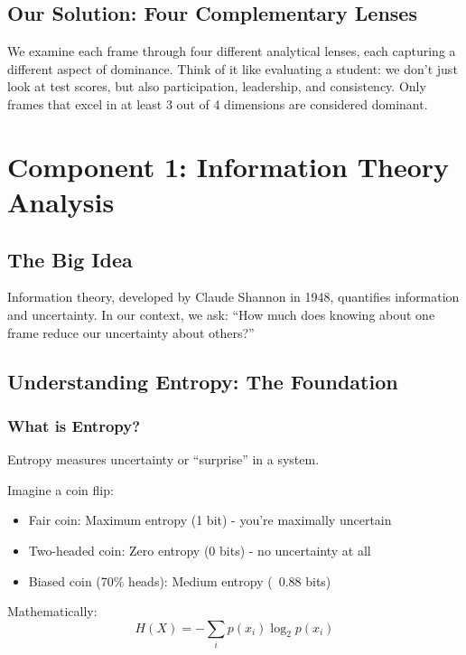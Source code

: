 \documentclass[11pt]{article}
\begin{document}
\subsection{Our Solution: Four Complementary Lenses}

We examine each frame through four different analytical lenses, each capturing a different aspect of dominance. Think of it like evaluating a student: we don't just look at test scores, but also participation, leadership, and consistency. Only frames that excel in at least 3 out of 4 dimensions are considered dominant.

\section{Component 1: Information Theory Analysis}

\subsection{The Big Idea}

Information theory, developed by Claude Shannon in 1948, quantifies information and uncertainty. In our context, we ask: ``How much does knowing about one frame reduce our uncertainty about others?''

\subsection{Understanding Entropy: The Foundation}

\subsubsection{What is Entropy?}

Entropy measures uncertainty or ``surprise'' in a system. 

\begin{tcolorbox}[mybox={Intuitive Example}]
Imagine a coin flip:
\begin{itemize}
    \item Fair coin: Maximum entropy (1 bit) - you're maximally uncertain
    \item Two-headed coin: Zero entropy (0 bits) - no uncertainty at all
    \item Biased coin (70\% heads): Medium entropy (~0.88 bits)
\end{itemize}
\end{tcolorbox}

Mathematically:
\[H(X) = -\sum_{i} p(x_i) \log_2 p(x_i)\]
\end{document}
